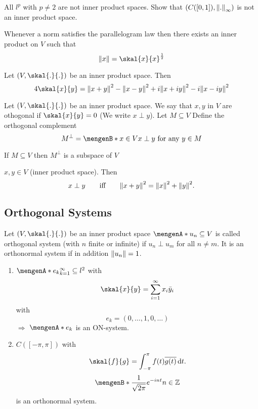 All $l^p$ with $p \neq 2$ are not inner product spaces. 
Show that $(C([0,1]),\norm{.}_{\infty})$ is not an inner product space.
\begin{bemerkung}
	Whenever a norm satisfies the parallelogram law then there exists an inner product on $V$ such that
	\[
		\norm{x} = \skal{x}{x}^{\frac{1}{2}}
	\]
\end{bemerkung}
\begin{theorem}
	Let $(V,\skal{.}{.})$ be an inner product space. Then 
	\[
		4 \skal{x}{y}  = \norm{x+y}^2- \norm{x-y}^2 + i \norm{x+ iy}^2 - i \norm{x - iy}^2
	\]
\end{theorem}
\begin{definition}
	Let $(V, \skal{.}{.})$ be an inner product space. We say that $x,y$ in $V$ are othogonal if $\skal{x}{y} = 0$ (We write $x \perp y$). Let $M \subseteq V$
	Define the orthogonal complement
	\[
		M^{\perp} = \set[x \in V]{x \perp y \text{ for any }y \in M}
	\]
\end{definition}
\begin{proposition}
	If $M \subseteq V$ then $M^{\perp}$ is a subspace of $V$
\end{proposition}
\begin{theorem}
	$x,y \in V$ (inner product space). Then
	\[
		x \perp y \qquad \text{iff} \qquad \norm{x+y}^2 = \norm{x}^2 + \norm{y}^2.
	\]
\end{theorem}

\subsection{Orthogonal Systems} 
\label{sub:orthogonal_systems}

Let $(V, \skal{.}{.})$ be an inner product space $\set{u_n} \subseteq V$ is called orthogonal system (with $n$ finite or infinite) if $u_n \perp u_m$ for all $n \neq m$. It is an orthonormal system if in addition $\norm{u_n}=1$. 

\begin{beispiele}
	\begin{enumerate}[1)]
		\item $\set{e_k}_{k=1}^{\infty} \subseteq l^2$ with 
		\[
			\skal{x}{y} = \sum^{\infty}_{i=1} x_i \bar{y}_i
		\]
		with 
		\[
			e_k = (0,\dots,1,0,\dots)
		\]
		$\Rightarrow$ $\set{e_k}$ is an ON-system. 
		\item $C([-\pi,\pi])$ with
		\[
			\skal{f}{g} = \int_{- \pi}^{\pi} f(t) \overline{g(t)} \,\mathrm{d}t.
		\]
		\[
			\set[\frac{1}{\sqrt{2 \pi}} e^{-int}]{n \in \mathbb{Z}}
		\]
		is an orthonormal system.
	\end{enumerate}
\end{beispiele}

